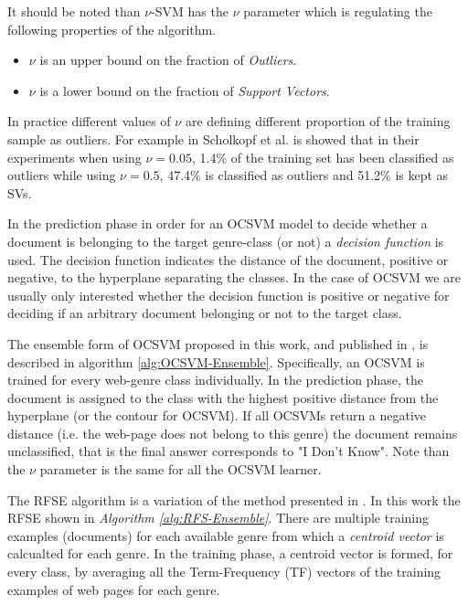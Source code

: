 It should be noted than $\nu$-SVM has the $\nu$ parameter which is regulating the following properties of the algorithm.
\begin{itemize}
\item $\nu$ is an upper bound on the fraction of \textit{Outliers}.
\item $\nu$ is a lower bound on the fraction of \textit{Support Vectors}.
\end{itemize}

In practice different values of $\nu$ are defining different proportion of the training sample as outliers. For example in Scholkopf et al. \citep{scholkopf1999estimating} is showed that in their experiments when using $\nu=0.05$, 1.4\% of the training set has been classified as outliers while using $\nu=0.5$, 47.4\% is classified as outliers and 51.2\% is kept as SVs.

In the prediction phase in order for an OCSVM model to decide whether a document is belonging to the target genre-class (or not) a \textit{decision function} is used. The decision function indicates the distance of the document, positive or negative, to the hyperplane separating the classes. In the case of OCSVM we are usually only interested whether the decision function is positive or negative for deciding if an arbitrary document belonging or not to the target class.

The ensemble form of  OCSVM proposed in this work, and published in \citep{pritsos2013open}, is described in algorithm \ref{alg:OCSVM-Ensemble}. Specifically, an OCSVM is trained for every web-genre class individually. In the prediction phase, the document is assigned to the class with the highest positive distance from the hyperplane (or the contour for OCSVM). If all OCSVMs return a negative distance (i.e. the web-page does not belong to this genre) the document remains unclassified, that is the final answer corresponds to "I Don't Know". Note than the $\nu$ parameter is the same for all the OCSVM learner. 

The RFSE algorithm is a variation of the method presented in \citep{koppel2011authorship}. In this work the RFSE shown in \textit{Algorithm \ref{alg:RFS-Ensemble}}. There are multiple training examples (documents) for each available genre from which a \textit{centroid vector} is calcualted for each genre. In the training phase, a centroid vector is formed, for every class, by averaging all the Term-Frequency (TF) vectors of the training examples of web pages for each genre.

